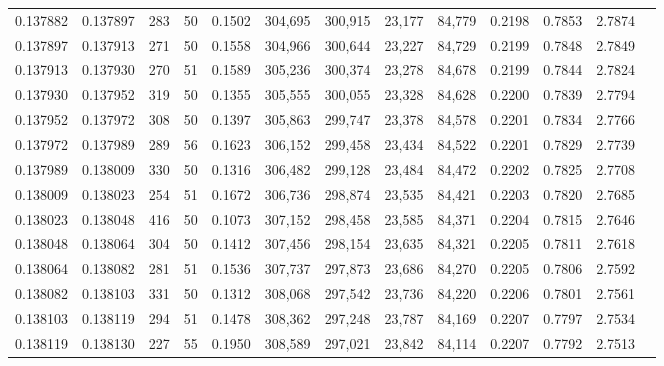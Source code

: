 \begin{tabular}{rrrrrrrrrrrrr}
0.137882 & 0.137897 &   283 &  50 &                                     0.1502 & 304,695 & 300,915 &  23,177 &  84,779 & 0.2198 & 0.7853 & 2.7874 \\
0.137897 & 0.137913 &   271 &  50 &                                     0.1558 & 304,966 & 300,644 &  23,227 &  84,729 & 0.2199 & 0.7848 & 2.7849 \\
0.137913 & 0.137930 &   270 &  51 &                                     0.1589 & 305,236 & 300,374 &  23,278 &  84,678 & 0.2199 & 0.7844 & 2.7824 \\
0.137930 & 0.137952 &   319 &  50 &                                     0.1355 & 305,555 & 300,055 &  23,328 &  84,628 & 0.2200 & 0.7839 & 2.7794 \\
0.137952 & 0.137972 &   308 &  50 &                                     0.1397 & 305,863 & 299,747 &  23,378 &  84,578 & 0.2201 & 0.7834 & 2.7766 \\
0.137972 & 0.137989 &   289 &  56 &                                     0.1623 & 306,152 & 299,458 &  23,434 &  84,522 & 0.2201 & 0.7829 & 2.7739 \\
0.137989 & 0.138009 &   330 &  50 &                                     0.1316 & 306,482 & 299,128 &  23,484 &  84,472 & 0.2202 & 0.7825 & 2.7708 \\
0.138009 & 0.138023 &   254 &  51 &                                     0.1672 & 306,736 & 298,874 &  23,535 &  84,421 & 0.2203 & 0.7820 & 2.7685 \\
0.138023 & 0.138048 &   416 &  50 &                                     0.1073 & 307,152 & 298,458 &  23,585 &  84,371 & 0.2204 & 0.7815 & 2.7646 \\
0.138048 & 0.138064 &   304 &  50 &                                     0.1412 & 307,456 & 298,154 &  23,635 &  84,321 & 0.2205 & 0.7811 & 2.7618 \\
0.138064 & 0.138082 &   281 &  51 &                                     0.1536 & 307,737 & 297,873 &  23,686 &  84,270 & 0.2205 & 0.7806 & 2.7592 \\
0.138082 & 0.138103 &   331 &  50 &                                     0.1312 & 308,068 & 297,542 &  23,736 &  84,220 & 0.2206 & 0.7801 & 2.7561 \\
0.138103 & 0.138119 &   294 &  51 &                                     0.1478 & 308,362 & 297,248 &  23,787 &  84,169 & 0.2207 & 0.7797 & 2.7534 \\
0.138119 & 0.138130 &   227 &  55 &                                     0.1950 & 308,589 & 297,021 &  23,842 &  84,114 & 0.2207 & 0.7792 & 2.7513 \\

\end{tabular}
